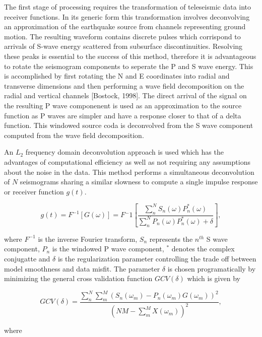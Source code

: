 \documentclass[draft, 12pt]{article}
\begin{document}
  The first stage of processing requires the transformation of teleseismic data into receiver functions. In its generic form this transformation involves deconvolving an approximation of the earthquake source from channels representing ground motion. The resulting waveform contains discrete pulses which corrispond to arrivals of S-wave energy scattered from subsurface discontinuities. Resolving these peaks is essential to the success of this method, therefore it is advantageous to rotate the seismogram components to seperate the P and S wave energy. This is accomplished by first rotating the N and E coordinates into radial and transverse dimensions and then performing a wave field decomposition on the radial and vertical channels [Bostock, 1998]. The direct arrival of the signal on the resulting P wave componenent is used as an approximation to the source function as P waves are simpler and have a response closer to that of a delta function. This windowed source coda is deconvolved from the S wave component computed from the wave field decomposition.

  An $L_2$ frequency domain deconvolution approach is used which has the advantages of computational efficiency as well as not requiring any assumptions about the noise in the data. This method performs a simultaneous deconvolution of $N$ seismograms sharing a similar slowness to compute a single impulse response or receiver function $g(t)$.

\begin{equation}
  g(t) = F^{-1} \left[ G(\omega) \right] = F{^-1}
 \left[ \frac {\sum_n^N S_n(\omega)P_n^*(\omega)} {\sum_n^N P_n(\omega)P_n^*(\omega) + \delta} \right ],
\end{equation}

where $F^{-1}$ is the inverse Fourier transform, $S_n$ represents the $n^{th}$ S wave component, $P_n$ is the windowed P wave component, $^*$ denotes the complex conjugatte and $\delta$ is the regularization parameter controlling the trade off between model smoothness and data misfit. The parameter $\delta$ is chosen programatically by minimizing the general cross validation function $GCV(\delta)$ which is given by

\begin{equation}
  GCV(\delta) = \frac {\sum_n^N\sum_m^M \left( S_n(\omega_m) - P_n(\omega_m)G(\omega_m) \right)^2 }
                      { \left( NM - \sum_m^M X(\omega_m) \right)^2 },
\end{equation}

where
\end{document}
